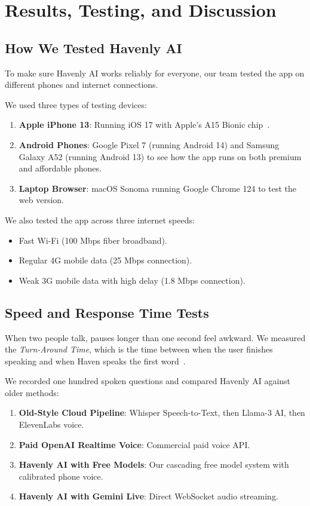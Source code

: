 \chapter{Results, Testing, and Discussion}
\label{chap:results_eval}

\section{How We Tested Havenly AI}
\label{sec:eval_testbed}

To make sure Havenly AI works reliably for everyone, our team tested the app on different phones and internet connections.

We used three types of testing devices:
\begin{enumerate}
    \item \textbf{Apple iPhone 13}: Running iOS 17 with Apple's A15 Bionic chip~\cite{reactnative2024hermes}.
    \item \textbf{Android Phones}: Google Pixel 7 (running Android 14) and Samsung Galaxy A52 (running Android 13) to see how the app runs on both premium and affordable phones.
    \item \textbf{Laptop Browser}: macOS Sonoma running Google Chrome 124 to test the web version.
\end{enumerate}

We also tested the app across three internet speeds:
\begin{itemize}
    \item Fast Wi-Fi (100 Mbps fiber broadband).
    \item Regular 4G mobile data (25 Mbps connection).
    \item Weak 3G mobile data with high delay (1.8 Mbps connection).
\end{itemize}

\section{Speed and Response Time Tests}
\label{sec:eval_latency}

When two people talk, pauses longer than one second feel awkward. We measured the \textit{Turn-Around Time}, which is the time between when the user finishes speaking and when Haven speaks the first word~\cite{geminiteam2024gemini15}.

We recorded one hundred spoken questions and compared Havenly AI against older methods:
\begin{enumerate}
    \item \textbf{Old-Style Cloud Pipeline}: Whisper Speech-to-Text, then Llama-3 AI, then ElevenLabs voice.
    \item \textbf{Paid OpenAI Realtime Voice}: Commercial paid voice API.
    \item \textbf{Havenly AI with Free Models}: Our cascading free model system with calibrated phone voice.
    \item \textbf{Havenly AI with Gemini Live}: Direct WebSocket audio streaming.
\end{enumerate}

